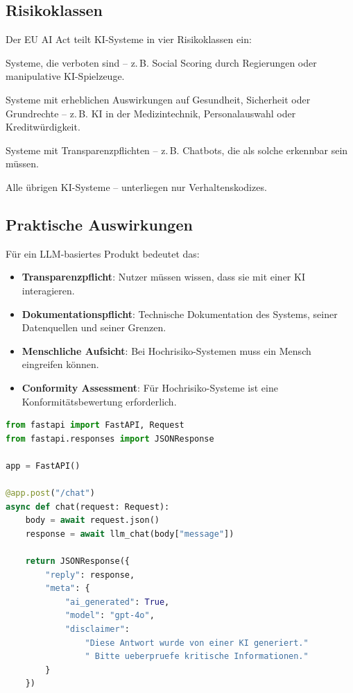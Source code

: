 \subsection{Risikoklassen}

Der EU AI Act teilt KI-Systeme in vier Risikoklassen ein:

\begin{description}[leftmargin=*,style=nextline]
    \item[Inakzeptables Risiko] Systeme, die verboten sind -- z.\,B. Social Scoring durch Regierungen oder manipulative KI-Spielzeuge.
    \item[Hochrisiko] Systeme mit erheblichen Auswirkungen auf Gesundheit, Sicherheit oder Grundrechte -- z.\,B. KI in der Medizintechnik, Personalauswahl oder Kreditwürdigkeit.
    \item[Begrenztes Risiko] Systeme mit Transparenzpflichten -- z.\,B. Chatbots, die als solche erkennbar sein müssen.
    \item[Minimales Risiko] Alle übrigen KI-Systeme -- unterliegen nur Verhaltenskodizes.
\end{description}

\subsection{Praktische Auswirkungen}

Für ein LLM-basiertes Produkt bedeutet das:

\begin{itemize}[leftmargin=*]
    \item \textbf{Transparenzpflicht}: Nutzer müssen wissen, dass sie mit einer KI interagieren.
    \item \textbf{Dokumentationspflicht}: Technische Dokumentation des Systems, seiner Datenquellen und seiner Grenzen.
    \item \textbf{Menschliche Aufsicht}: Bei Hochrisiko-Systemen muss ein Mensch eingreifen können.
    \item \textbf{Conformity Assessment}: Für Hochrisiko-Systeme ist eine Konformitätsbewertung erforderlich.
\end{itemize}

\begin{lstlisting}[language=Python,caption=Transparenz-Hinweis in einer Chat-API]
from fastapi import FastAPI, Request
from fastapi.responses import JSONResponse

app = FastAPI()

@app.post("/chat")
async def chat(request: Request):
    body = await request.json()
    response = await llm_chat(body["message"])

    return JSONResponse({
        "reply": response,
        "meta": {
            "ai_generated": True,
            "model": "gpt-4o",
            "disclaimer":
                "Diese Antwort wurde von einer KI generiert."
                " Bitte ueberpruefe kritische Informationen."
        }
    })
\end{lstlisting}

